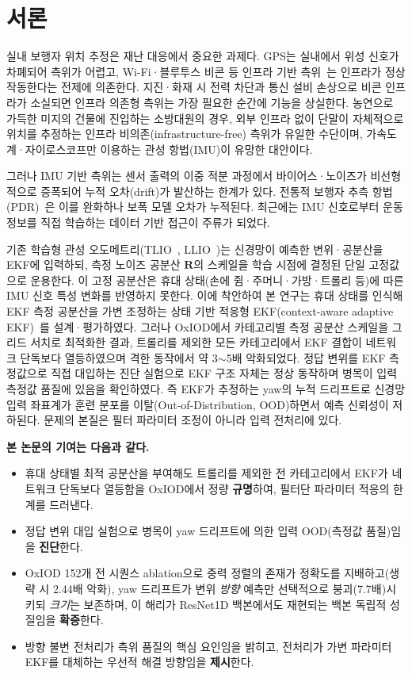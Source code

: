 \documentclass[10pt,twocolumn,a4paper]{article}
\begin{document}
\section{서론}
실내 보행자 위치 추정은 재난 대응에서 중요한 과제다. GPS는 실내에서 위성 신호가 차폐되어 측위가 어렵고, Wi-Fi·블루투스 비콘 등 인프라 기반 측위~\cite{radar}는 인프라가 정상 작동한다는 전제에 의존한다. 지진·화재 시 전력 차단과 통신 설비 손상으로 비콘 인프라가 소실되면 인프라 의존형 측위는 가장 필요한 순간에 기능을 상실한다. 농연으로 가득한 미지의 건물에 진입하는 소방대원의 경우, 외부 인프라 없이 단말이 자체적으로 위치를 추정하는 인프라 비의존(infrastructure-free) 측위가 유일한 수단이며, 가속도계·자이로스코프만 이용하는 관성 항법(IMU)이 유망한 대안이다.

그러나 IMU 기반 측위는 센서 출력의 이중 적분 과정에서 바이어스·노이즈가 비선형적으로 증폭되어 누적 오차(drift)가 발산하는 한계가 있다. 전통적 보행자 추측 항법(PDR)~\cite{harle}은 이를 완화하나 보폭 모델 오차가 누적된다. 최근에는 IMU 신호로부터 운동 정보를 직접 학습하는 데이터 기반 접근이 주류가 되었다.

기존 학습형 관성 오도메트리(TLIO~\cite{tlio}, LLIO~\cite{llio})는 신경망이 예측한 변위·공분산을 EKF에 입력하되, 측정 노이즈 공분산 $\mathbf{R}$의 스케일을 학습 시점에 결정된 단일 고정값으로 운용한다. 이 고정 공분산은 휴대 상태(손에 쥠·주머니·가방·트롤리 등)에 따른 IMU 신호 특성 변화를 반영하지 못한다. 이에 착안하여 본 연구는 휴대 상태를 인식해 EKF 측정 공분산을 가변 조정하는 상태 기반 적응형 EKF(context-aware adaptive EKF)~\cite{akf}를 설계·평가하였다. 그러나 OxIOD에서 카테고리별 측정 공분산 스케일을 그리드 서치로 최적화한 결과, 트롤리를 제외한 모든 카테고리에서 EKF 결합이 네트워크 단독보다 열등하였으며 격한 동작에서 약 3$\sim$5배 악화되었다. 정답 변위를 EKF 측정값으로 직접 대입하는 진단 실험으로 EKF 구조 자체는 정상 동작하며 병목이 입력 측정값 품질에 있음을 확인하였다. 즉 EKF가 추정하는 yaw의 누적 드리프트로 신경망 입력 좌표계가 훈련 분포를 이탈(Out-of-Distribution, OOD)하면서 예측 신뢰성이 저하된다. 문제의 본질은 필터 파라미터 조정이 아니라 입력 전처리에 있다.

\noindent\textbf{본 논문의 기여는 다음과 같다.}
\begin{itemize}\setlength{\itemsep}{1pt}
\item 휴대 상태별 최적 공분산을 부여해도 트롤리를 제외한 전 카테고리에서 EKF가 네트워크 단독보다 열등함을 OxIOD에서 정량 \textbf{규명}하여, 필터단 파라미터 적응의 한계를 드러낸다.
\item 정답 변위 대입 실험으로 병목이 yaw 드리프트에 의한 입력 OOD(측정값 품질)임을 \textbf{진단}한다.
\item OxIOD 152개 전 시퀀스 ablation으로 중력 정렬의 존재가 정확도를 지배하고(생략 시 2.44배 악화), yaw 드리프트가 변위 \emph{방향} 예측만 선택적으로 붕괴(7.7배)시키되 \emph{크기}는 보존하며, 이 해리가 ResNet1D 백본에서도 재현되는 백본 독립적 성질임을 \textbf{확증}한다.
\item 방향 불변 전처리가 측위 품질의 핵심 요인임을 밝히고, 전처리가 가변 파라미터 EKF를 대체하는 우선적 해결 방향임을 \textbf{제시}한다.
\end{itemize}
\end{document}
